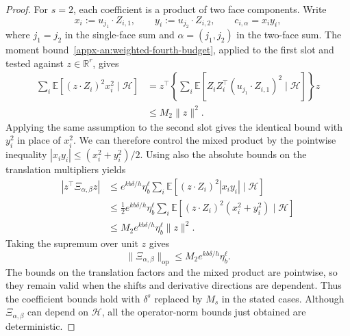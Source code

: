 \documentclass[11pt,letterpaper]{article}
\theoremstyle{remark}
\newcommand{\E}{\mathbb E}
\newcommand{\R}{\mathbb R}
\newcommand{\op}{\mathrm{op}}
\begin{document}
\begin{proof}
For $s=2$, each coefficient is a product of two face components.
Write
\[
 x_i:=u_{j_1}\cdot Z_{i,1},\qquad
 y_i:=u_{j_2}\cdot Z_{i,2},\qquad c_{i,\alpha}=x_iy_i,
\]
where $j_1=j_2$ in the single-face sum and
$\alpha=(j_1,j_2)$ in the two-face sum. The moment
bound~\eqref{appx-an:weighted-fourth-budget}, applied to the
first slot and tested against $z\in\R^r$, gives
\[
 \begin{aligned}
 \sum_i\E[(z\cdot Z_i)^2x_i^2\mid\mathcal H]
 &=z^\top\left\{\sum_i\E[
       Z_iZ_i^\top(u_{j_1}\cdot Z_{i,1})^2
                         \mid\mathcal H]\right\}z\\
 &\le M_2\|z\|^2.
 \end{aligned}
\]
Applying the same assumption to the second slot gives the
identical bound with $y_i^2$ in place of $x_i^2$.
We can therefore control the mixed product by the pointwise
inequality $|x_iy_i|\le(x_i^2+y_i^2)/2$. Using also the
absolute bounds on the translation multipliers yields
\[
 \begin{aligned}
 |z^\top\Xi_{\alpha,\beta}z|
 &\le e^{kb\delta/h}\eta_b^\ell
       \sum_i\E[(z\cdot Z_i)^2|x_iy_i|\mid\mathcal H]\\
 &\le\frac12e^{kb\delta/h}\eta_b^\ell
       \sum_i\E[(z\cdot Z_i)^2(x_i^2+y_i^2)
                         \mid\mathcal H]\\
 &\le M_2e^{kb\delta/h}\eta_b^\ell\|z\|^2.
 \end{aligned}
\]
Taking the supremum over unit $z$ gives
\[
 \|\Xi_{\alpha,\beta}\|_{\op}
 \le M_2e^{kb\delta/h}\eta_b^\ell.
\]
The bounds on the translation factors and the mixed product are
pointwise, so they remain valid when the shifts and derivative
directions are dependent. Thus the coefficient bounds hold with
$\delta^s$ replaced by $M_s$ in the stated cases. Although
$\Xi_{\alpha,\beta}$ can depend on $\mathcal H$, all the
operator-norm bounds just obtained are deterministic.


\end{proof}
\end{document}
